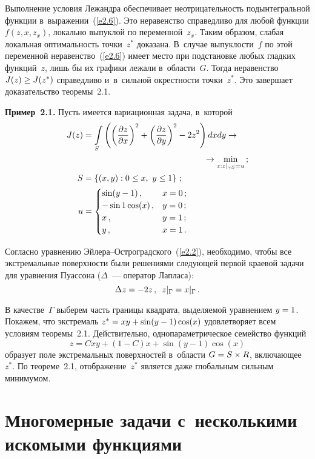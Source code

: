 \begin{multicols}{2}
Выполнение условия Лежандра обеспечивает неотрицательность подынтегральной 
функции в~выражении~(\ref{e2.6}). Это неравенство справедливо для любой 
функции $f(z,x,z_x)$, локально выпуклой по переменной~$z_x$. Таким образом, 
слабая локальная оптимальность точки~$z^*$ доказана. В~случае вы\-пук\-лости~$f$ 
по этой переменной неравенство~(\ref{e2.6}) имеет место при подстановке любых 
гладких функций~$z$, лишь бы их графики лежали в~области~$G$. Тогда 
неравенство $J(z)\hm\geq J(z^*)$ справедливо и~в~сильной окрестности 
точки~$z^*$. Это завершает доказательство теоремы~2.1.

\smallskip

\noindent
\textbf{Пример~2.1.} Пусть имеется вариационная задача, в~которой 
\begin{align*}
J(z)&=\int\limits_S \left( \left(\fr{\partial z}{\partial x}\right)^2+\left(\fr{\partial z}{\partial y}\right)^2-2z^2\right) dxdy\to {}\\
&{}\hspace*{50mm}\to \min\limits_{z: z\vert_{\gamma S}=u}\,;
\\
        S&= \left\{ (x,y): 0\leq x,\ y\leq 1\right\}\,;
    \\
    u&=\begin{cases} \sin(y-1)\,, & x=0\,;\\
    -\sin 1 \cos (x)\,, & y=0\,;\\
    x\,, & y=1\,;\\
    y\,, & x=1\,.
    \end{cases}
   \end{align*}
    
    Согласно уравнению Эй\-ле\-ра--Ост\-ро\-град\-ско\-го~(\ref{e2.2}), 
необходимо, чтобы все экстремальные поверхности были решениями следующей 
первой краевой задачи для уравнения Пуассона ($\Delta$~--- оператор Лапласа): 
    $$
    \Delta z  =-2z\,,\enskip z\vert_\Gamma =x\vert_\Gamma\,.
    $$
    
    В качестве~$\Gamma$ выберем часть границы квадрата, выделяемой 
уравнением $y\hm=1$. Покажем, что экстремаль $z^*\hm= xy \hm+ \sin (y\hm-
1)\cos(x)$ удовлетворяет всем условиям теоремы~2.1. Действительно, 
однопараметрическое семейство функций
    $$
    z=Cxy+(1-C)x+\sin (y-1)\cos(x)
    $$
образует поле экстремальных поверхностей в~об\-ласти $G\hm= S\times R$, 
включающее~$z^*$. По теореме~2.1, отображение~$z^*$ является даже глобальным 
сильным минимумом.

\section{Многомерные задачи с~несколькими искомыми функциями}
 

\end{multicols}
